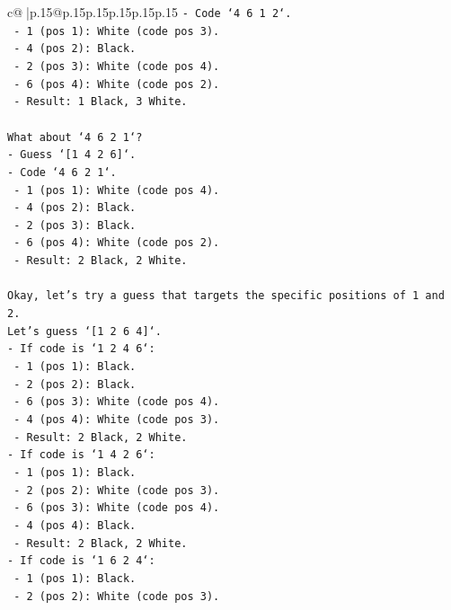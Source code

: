 \documentclass{article}
\begin{document}
{\begin{supertabular}{c@{$\;$}|p{.15\linewidth}@{}p{.15\linewidth}p{.15\linewidth}p{.15\linewidth}p{.15\linewidth}p{.15\linewidth}}
{{{\texttt{{-} Code `4 6 1 2`.} \\
\texttt{  {-} 1 (pos 1): White (code pos 3).} \\
\texttt{  {-} 4 (pos 2): Black.} \\
\texttt{  {-} 2 (pos 3): White (code pos 4).} \\
\texttt{  {-} 6 (pos 4): White (code pos 2).} \\
\texttt{  {-} Result: 1 Black, 3 White.} \\
\\ 
\texttt{What about `4 6 2 1`?} \\
\texttt{{-} Guess `{[}1 4 2 6{]}`.} \\
\texttt{{-} Code `4 6 2 1`.} \\
\texttt{  {-} 1 (pos 1): White (code pos 4).} \\
\texttt{  {-} 4 (pos 2): Black.} \\
\texttt{  {-} 2 (pos 3): Black.} \\
\texttt{  {-} 6 (pos 4): White (code pos 2).} \\
\texttt{  {-} Result: 2 Black, 2 White.} \\
\\ 
\texttt{Okay, let's try a guess that targets the specific positions of 1 and 2.} \\
\texttt{Let's guess `{[}1 2 6 4{]}`.} \\
\texttt{{-} If code is `1 2 4 6`:} \\
\texttt{  {-} 1 (pos 1): Black.} \\
\texttt{  {-} 2 (pos 2): Black.} \\
\texttt{  {-} 6 (pos 3): White (code pos 4).} \\
\texttt{  {-} 4 (pos 4): White (code pos 3).} \\
\texttt{  {-} Result: 2 Black, 2 White.} \\
\texttt{{-} If code is `1 4 2 6`:} \\
\texttt{  {-} 1 (pos 1): Black.} \\
\texttt{  {-} 2 (pos 2): White (code pos 3).} \\
\texttt{  {-} 6 (pos 3): White (code pos 4).} \\
\texttt{  {-} 4 (pos 4): Black.} \\
\texttt{  {-} Result: 2 Black, 2 White.} \\
\texttt{{-} If code is `1 6 2 4`:} \\
\texttt{  {-} 1 (pos 1): Black.} \\
\texttt{  {-} 2 (pos 2): White (code pos 3).} \\
}}}
\end{supertabular}}
\end{document}
